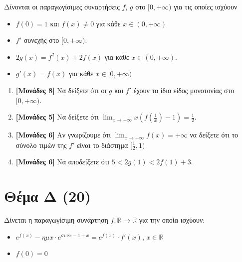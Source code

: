 \documentclass[14pt]{extarticle}
\begin{document}
  Δίνονται οι παραγωγίσιμες συναρτήσεις $f$, $g$ στο $[0,+\infty)$ για τις οποίες ισχύουν
  \begin{itemize}
    \item $f(0)=1$ και $f(x)\ne 0$ για κάθε $x\in (0,+\infty)$
    \item $f'$ συνεχής στο $[0,+\infty)$.
    \item $2g(x)=f^2(x)+2f(x)$ για κάθε $x\in (0,+\infty)$.
    \item $g'(x)=f(x)$ για κάθε $x\in [0,+\infty)$
  \end{itemize}
  \begin{enumerate}
    \item \textbf{[Μονάδες 8]}  Να δείξετε ότι οι $g$ και $f'$ έχουν το ίδιο είδος μονοτονίας στο $[0,+\infty)$.
    \item \textbf{[Μονάδες 5]}  Να δείξετε ότι $\lim_{x\to +\infty}x\left(f\left(\frac{1}{x}\right)-1\right)=\frac{1}{2}$.
    \item \textbf{[Μονάδες 6]}  Αν γνωρίζουμε ότι $\lim_{x\to +\infty}f(x)=+\infty$ να δείξετε ότι το σύνολο τιμών της $f'$ είναι το διάστημα $[\frac{1}{2},1)$
    \item \textbf{[Μονάδες 6]}  Να αποδείξετε ότι $5<2g(1)<2f(1)+3$.
  \end{enumerate}

\section*{Θέμα Δ (20)}
  \noindent

  Δίνεται η παραγωγίσιμη συνάρτηση $f:\mathbb{R}\to \mathbb{R}$ για την οποία ισχύουν:
  \begin{itemize}
    \item $e^{f(x)}-ημx\cdot e^{συνx-1+x}=e^{f(x)}\cdot f'(x)$, $x\in\mathbb{R}$
    \item $f(0)=0$
  \end{itemize}
\end{document}
